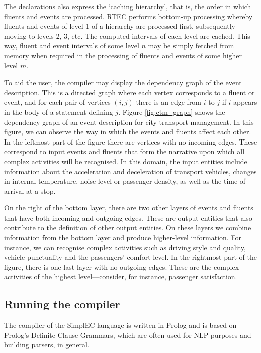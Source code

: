 The declarations also express the `caching hierarchy', that is, the order in which fluents and events are processed. RTEC performs bottom-up processing whereby fluents and events of level 1 of a hierarchy are processed first, subsequently moving to levels 2, 3, etc. The computed intervals of each level are cached. This way, fluent and event intervals of some level $n$ may be simply fetched from memory when required in the processing of fluents and events of some higher level $m$.

To aid the user, the compiler may display the dependency graph of the event description. This is a directed graph where each vertex corresponds to a fluent or event, and for each pair of vertices $(i, j)$ there is an edge from $i$ to $j$ if $i$ appears in the body of a statement defining $j$. Figure \ref{fig:ctm_graph} shows the dependency graph of an event description for city transport management. In this figure, we can observe the way in which the events and fluents affect each other. In the leftmost part of the figure there are vertices with no incoming edges. These correspond to input events and fluents that form the narrative upon which all complex activities will be recognised. In this domain, the input entities include information about the acceleration and deceleration of  transport vehicles, changes in  internal temperature, noise level or passenger density, as well as the time of arrival at a stop.

On the right of the bottom layer, there are two other layers of events and fluents that have both incoming and outgoing edges. These are output entities that also contribute to the definition of other output entities. On these layers we combine information from the bottom layer and produce higher-level information. For instance, we can recognise complex activities such as driving style and quality, vehicle punctuality and the passengers' comfort level.
In the rightmost part of the figure, there is one last layer with no outgoing edges. These are the complex activities of the highest level---consider, for instance, passenger satisfaction.

\subsection{Running the compiler}

The compiler of the SimplEC language is written in Prolog and is based on Prolog's Definite Clause Grammars, which are often used for NLP purposes and building parsers, in general.

